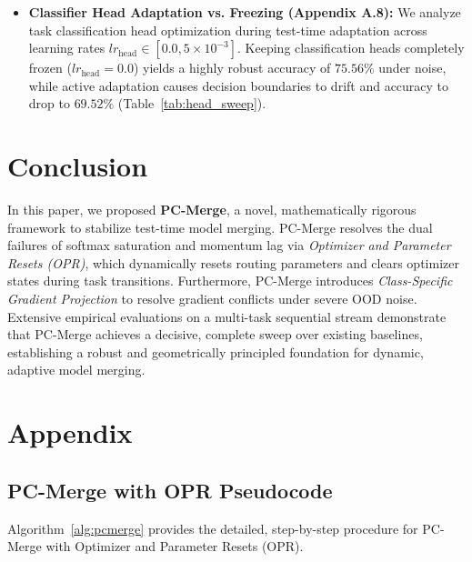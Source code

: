 \documentclass{article}
\theoremstyle{plain}
\theoremstyle{definition}
\theoremstyle{remark}
\begin{document}
\begin{itemize}
    \item \textbf{Classifier Head Adaptation vs. Freezing (Appendix A.8):} We analyze task classification head optimization during test-time adaptation across learning rates $lr_{\text{head}} \in [0.0, 5 \times 10^{-3}]$. Keeping classification heads completely frozen ($lr_{\text{head}}=0.0$) yields a highly robust accuracy of $75.56\%$ under noise, while active adaptation causes decision boundaries to drift and accuracy to drop to $69.52\%$ (Table~\ref{tab:head_sweep}).
\end{itemize}

\section{Conclusion}
\label{sec:conclusion}
In this paper, we proposed \textbf{PC-Merge}, a novel, mathematically rigorous framework to stabilize test-time model merging. PC-Merge resolves the dual failures of softmax saturation and momentum lag via \emph{Optimizer and Parameter Resets (OPR)}, which dynamically resets routing parameters and clears optimizer states during task transitions. Furthermore, PC-Merge introduces \emph{Class-Specific Gradient Projection} to resolve gradient conflicts under severe OOD noise. Extensive empirical evaluations on a multi-task sequential stream demonstrate that PC-Merge achieves a decisive, complete sweep over existing baselines, establishing a robust and geometrically principled foundation for dynamic, adaptive model merging.

\clearpage



\newpage
\appendix
\onecolumn
\section{Appendix}

\subsection{PC-Merge with OPR Pseudocode}
Algorithm~\ref{alg:pcmerge} provides the detailed, step-by-step procedure for PC-Merge with Optimizer and Parameter Resets (OPR).
\end{document}
